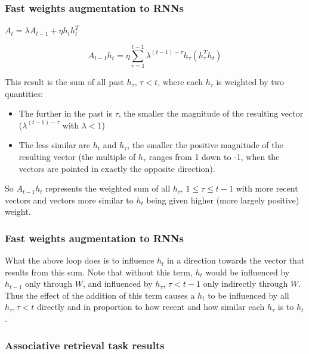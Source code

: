 \documentclass{beamer}
\begin{document}
\begin{frame}
  \frametitle{Fast weights augmentation to RNNs}
    $A_t = \lambda A_{t-1} + \eta h_t h_t^T$

    \begin{equation*}
A_{t-1} h_t = \eta \sum_{\tau=1}^{t-1} \lambda^{(t-1) - \tau} h_\tau \left(h_\tau^T h_t\right)
    \end{equation*}

This result is the sum of all past $h_\tau,\, \tau < t$, where each $h_\tau$ is weighted by two quantities:

\begin{itemize}
\item The further in the past is $\tau$, the smaller the magnitude of the resulting vector ($\lambda^{(t-1) - \tau}$ with $\lambda < 1$)
\item The less similar are $h_t$ and $h_\tau$, the smaller the positive magnitude of the resulting vector (the multiple of $h_\tau$ ranges from 1 down to -1, when the vectors are pointed in exactly the opposite direction).
\end{itemize}
%
So $A_{t-1} h_t$ represents the weighted sum of all $h_\tau,\, 1 \leq \tau \leq t-1$ with more recent vectors and vectors more similar to $h_t$ being given higher (more largely positive) weight.
\end{frame}

\begin{frame}
  \frametitle{Fast weights augmentation to RNNs}
  What the above loop does is to influence $h_t$ in a direction towards the vector that results from this sum. Note that without this term, $h_t$ would be influenced by $h_{t-1}$ only through $W$, and influenced by $h_\tau,\, \tau < t-1$ only indirectly through $W$. Thus the effect of the addition of this term causes a $h_t$ to be influenced by all $h_\tau, \tau < t$ directly and in proportion to how recent and how similar each $h_\tau$ is to $h_t$.
\end{frame}

\begin{frame}
  \frametitle{Associative retrieval task results}
\end{frame}

\end{document}
